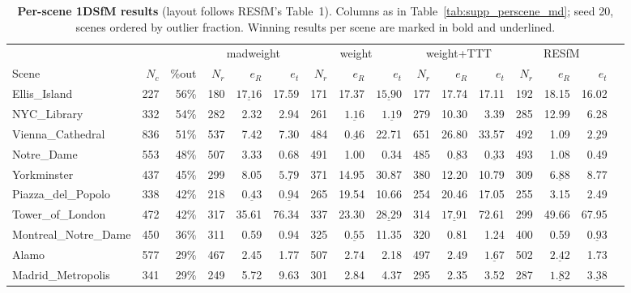 \documentclass[10pt,twocolumn,letterpaper]{article}
\begin{document}
\begin{table}[t]\centering\footnotesize
\caption{\textbf{Per-scene 1DSfM results} (layout follows RESfM's Table~1). Columns as in
Table~\ref{tab:supp_perscene_md}; seed 20, scenes ordered by outlier fraction. Winning results per scene are marked in bold and
underlined.}
\label{tab:supp_perscene_1dsfm}
\setlength{\tabcolsep}{2.5pt}%
\begin{tabular}{lrrrrrrrrrrrrrrr}
\toprule
& & & \multicolumn{3}{c}{madweight} & \multicolumn{3}{c}{weight} & \multicolumn{3}{c}{weight+TTT} & \multicolumn{3}{c}{RESfM}\\
\cmidrule(lr){4-6}\cmidrule(lr){7-9}\cmidrule(lr){10-12}\cmidrule(lr){13-15}
Scene & $N_c$ & \%out & $N_r$ & $e_R$ & $e_t$ & $N_r$ & $e_R$ & $e_t$ & $N_r$ & $e_R$ & $e_t$ & $N_r$ & $e_R$ & $e_t$\\
\midrule
Ellis\_Island & 227 & 56\% & 180 & $\underline{\mathbf{17.16}}$ & 17.59 & 171 & 17.37 & $\underline{\mathbf{15.90}}$ & 177 & 17.74 & 17.11 & 192 & 18.15 & 16.02\\
NYC\_Library & 332 & 54\% & 282 & 2.32 & 2.94 & 261 & $\underline{\mathbf{1.16}}$ & $\underline{\mathbf{1.19}}$ & 279 & 10.30 & 3.39 & 285 & 12.99 & 6.28\\
Vienna\_Cathedral & 836 & 51\% & 537 & 7.42 & 7.30 & 484 & $\underline{\mathbf{0.46}}$ & 22.71 & 651 & 26.80 & 33.57 & 492 & 1.09 & $\underline{\mathbf{2.29}}$\\
Notre\_Dame & 553 & 48\% & 507 & 3.33 & 0.68 & 491 & 1.00 & 0.34 & 485 & $\underline{\mathbf{0.83}}$ & $\underline{\mathbf{0.33}}$ & 493 & 1.08 & 0.49\\
Yorkminster & 437 & 45\% & 299 & 8.05 & $\underline{\mathbf{5.79}}$ & 371 & 14.95 & 30.87 & 380 & 12.20 & 10.79 & 309 & $\underline{\mathbf{6.88}}$ & 8.77\\
Piazza\_del\_Popolo & 338 & 42\% & 218 & $\underline{\mathbf{0.43}}$ & $\underline{\mathbf{0.94}}$ & 265 & 19.54 & 10.66 & 254 & 20.46 & 17.05 & 255 & 3.15 & 2.49\\
Tower\_of\_London & 472 & 42\% & 317 & 35.61 & 76.34 & 337 & 23.30 & $\underline{\mathbf{28.29}}$ & 314 & $\underline{\mathbf{17.91}}$ & 72.61 & 299 & 49.66 & 67.95\\
Montreal\_Notre\_Dame & 450 & 36\% & 311 & 0.59 & 0.94 & 325 & $\underline{\mathbf{0.55}}$ & 11.35 & 320 & 0.81 & 1.24 & 400 & 0.59 & $\underline{\mathbf{0.93}}$\\
Alamo & 577 & 29\% & 467 & 2.45 & 1.77 & 507 & 2.74 & 2.18 & 497 & 2.49 & $\underline{\mathbf{1.67}}$ & 502 & $\underline{\mathbf{2.42}}$ & 1.73\\
Madrid\_Metropolis & 341 & 29\% & 249 & 5.72 & 9.63 & 301 & 2.84 & 4.37 & 295 & 2.35 & 3.52 & 287 & $\underline{\mathbf{1.82}}$ & $\underline{\mathbf{3.38}}$\\
\bottomrule
\end{tabular}
\end{table}
\end{document}
